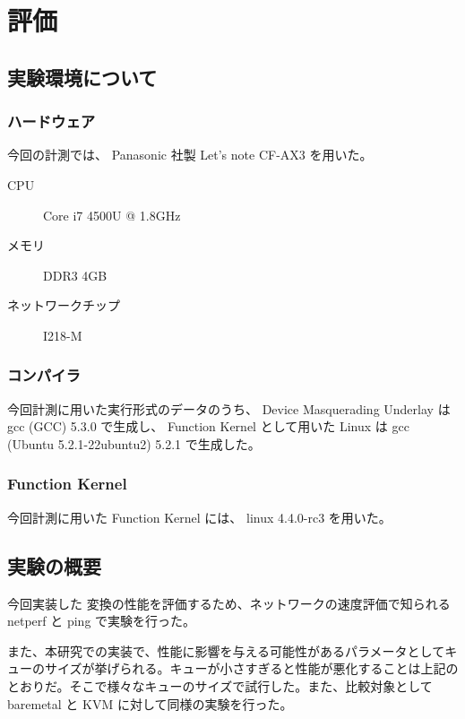 \documentclass[a4paper,11pt,report]{ltjsbook}
\begin{document}
\chapter{評価}

\section{実験環境について}

\subsection{ハードウェア}
今回の計測では、 Panasonic 社製 Let's note CF-AX3 を用いた。

\begin{description}
\item[CPU] Core i7 4500U @ 1.8GHz
\item[メモリ] DDR3 4GB
\item[ネットワークチップ] I218-M
\end{description}

\subsection{コンパイラ}

今回計測に用いた実行形式のデータのうち、 Device Masquerading Underlay は gcc (GCC) 5.3.0 で生成し、 Function Kernel として用いた Linux は gcc (Ubuntu 5.2.1-22ubuntu2) 5.2.1 で生成した。

\subsection{Function Kernel}

今回計測に用いた Function Kernel には、 linux 4.4.0-rc3 を用いた。

\section{実験の概要}

今回実装した  変換の性能を評価するため、ネットワークの速度評価で知られる netperf と ping で実験を行った。

また、本研究での実装で、性能に影響を与える可能性があるパラメータとしてキューのサイズが挙げられる。キューが小さすぎると性能が悪化することは上記のとおりだ。そこで様々なキューのサイズで試行した。また、比較対象として baremetal と KVM に対して同様の実験を行った。
\end{document}
